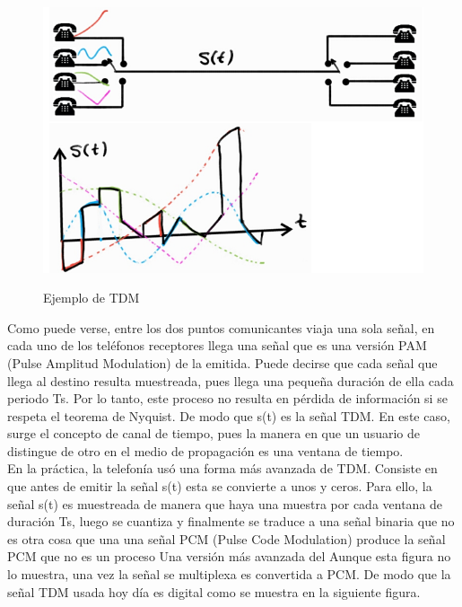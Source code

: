 \begin{figure}[h!]
	\captionsetup{justification = raggedright, singlelinecheck = false}
	\caption{Ejemplo de TDM} 
	\centering
	\includegraphics[scale=0.5]{Imagenes/Telefono.PNG}
	\label{fig:Telefono}
\end{figure}

Como puede verse, entre los dos puntos comunicantes viaja una sola señal, en cada uno de los teléfonos receptores llega una señal que es una versión PAM (Pulse Amplitud Modulation) de la emitida. Puede decirse que cada señal que llega al destino resulta muestreada, pues llega una pequeña duración de ella cada periodo Ts. Por lo tanto, este proceso no resulta en pérdida de información si se respeta el teorema de Nyquist. De modo que s(t) es la señal TDM. En este caso, surge el concepto de canal de tiempo, pues la manera en que un usuario de distingue de otro en el medio de propagación es una ventana de tiempo. \\

En la práctica, la telefonía usó una forma más avanzada de TDM. Consiste en que antes de emitir la señal s(t) esta se convierte a unos y ceros. Para ello, la señal s(t) es muestreada de manera que haya una muestra por cada ventana de duración Ts, luego se cuantiza y finalmente se traduce a una señal binaria que no es otra cosa que una una señal PCM (Pulse Code Modulation) produce la señal PCM que no es un proceso Una versión más avanzada del
Aunque esta figura no lo muestra, una vez la señal se multiplexa es convertida a PCM. De modo que la señal TDM usada hoy día es digital como se muestra en la siguiente figura. \\

